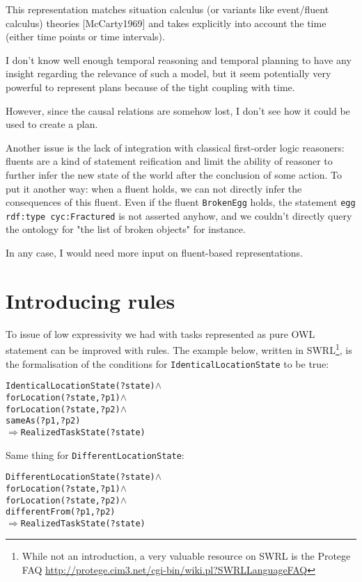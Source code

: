 This representation matches situation calculus (or variants like event/fluent
calculus) theories [McCarty1969] and takes explicitly into account the time
(either time points or time intervals).

I don't know well enough temporal reasoning and temporal planning to have any
insight regarding the relevance of such a model, but it seem potentially very
powerful to represent plans because of the tight coupling with time.

However, since the causal relations are somehow lost, I don't see how it could
be used to create a plan.

Another issue is the lack of integration with classical first-order logic
reasoners: fluents are a kind of statement reification and limit the ability of
reasoner to further infer the new state of the world after the conclusion of
some action. To put it another way: when a fluent holds, we can not directly
infer the consequences of this fluent. Even if the fluent {\tt BrokenEgg}
holds, the statement {\tt egg rdf:type cyc:Fractured} is not asserted anyhow,
and we couldn't directly query the ontology for "the list of broken objects"
for instance.

In any case, I would need more input on fluent-based representations.


\section{Introducing rules}

To issue of low expressivity we had with tasks represented as pure OWL
statement can be improved with rules. The example below, written in
SWRL\footnote{While not an introduction, a very valuable resource on SWRL is
the Protege FAQ \url{http://protege.cim3.net/cgi-bin/wiki.pl?SWRLLanguageFAQ}},
is the formalisation of the conditions for {\tt IdenticalLocationState} to be
true:



\begin{alltt}

IdenticalLocationState(?state) \(\land\)
forLocation(?state, ?p1) \(\land\)
forLocation(?state, ?p2) \(\land\)
sameAs(?p1, ?p2)
\(\Rightarrow\) RealizedTaskState(?state)

\end{alltt}

Same thing for {\tt DifferentLocationState}:



\begin{alltt}

DifferentLocationState(?state) \(\land\)
forLocation(?state, ?p1) \(\land\)
forLocation(?state, ?p2) \(\land\)
differentFrom(?p1, ?p2)
\(\Rightarrow\) RealizedTaskState(?state)

\end{alltt}

